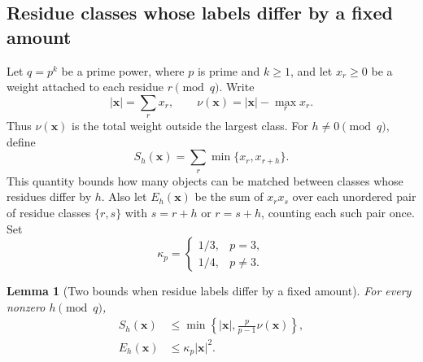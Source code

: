 \documentclass[11pt]{article}
\numberwithin{equation}{section}
\newtheorem{lemma}[lemma]{Lemma}
\theoremstyle{remark}
\begin{document}
\subsection{Residue classes whose labels differ by a fixed amount}
Let $q=p^k$ be a prime power, where $p$ is prime and $k\ge1$, and let
$x_r\ge0$ be a weight attached to
each residue $r\pmod q$.  Write
\[
 |\mathbf x|=\sum_r x_r,
 \qquad
 \nu(\mathbf x)=|\mathbf x|-\max_r x_r.
\]
Thus $\nu(\mathbf x)$ is the total weight outside the largest class.
For $h\ne0\pmod q$, define
\begin{equation}\label{eq:def-fixed-difference-matching}
 S_h(\mathbf x)=\sum_r\min\{x_r,x_{r+h}\}.
\end{equation}
This quantity bounds how many objects can be matched between classes whose
residues differ by $h$.  Also let $E_h(\mathbf x)$ be the sum of $x_rx_s$
over each unordered pair of residue classes $\{r,s\}$ with $s=r+h$ or
$r=s+h$, counting each such pair once.  Set
\begin{equation}\label{eq:def-kappa-p}
 \kappa_p=
 \begin{cases}
 1/3,&p=3,\\
 1/4,&p\ne3.
 \end{cases}
\end{equation}
\begin{lemma}[Two bounds when residue labels differ by a fixed amount]
\label{lem:fixed-difference}
For every nonzero $h\pmod q$,
\begin{align}
 S_h(\mathbf x)
 &\le \min\left\{|\mathbf x|,\frac{p}{p-1}\nu(\mathbf x)\right\},
 \label{eq:fixed-difference-matching}\\
 E_h(\mathbf x)&\le\kappa_p|\mathbf x|^2.
 \label{eq:fixed-difference-pairs}
\end{align}
\end{lemma}
\end{document}
